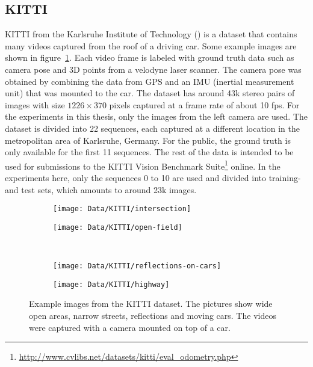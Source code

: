 		\subsection{KITTI}
			KITTI from the Karlsruhe Institute of Technology (\cite{geiger2013vision}) is a dataset that contains many videos captured from the roof of a driving car.
			Some example images are shown in figure~\ref{fig:example-images-from-KITTI}.
			Each video frame is labeled with ground truth data such as camera pose and 3D points from a velodyne laser scanner.
			The camera pose was obtained by combining the data from GPS and an IMU (inertial measurement unit) that was mounted to the car.
			The dataset has around 43k stereo pairs of images with size $1226 \times 370$ pixels captured at a frame rate of about 10 fps.
			For the experiments in this thesis, only the images from the left camera are used.
			The dataset is divided into 22 sequences, each captured at a different location in the metropolitan area of Karlsruhe, Germany.
			For the public, the ground truth is only available for the first 11 sequences.
			The rest of the data is intended to be used for submissions to the KITTI Vision Benchmark Suite\footnote{\url{http://www.cvlibs.net/datasets/kitti/eval_odometry.php}} 
			online.
			In the experiments here, only the sequences 0 to 10 are used and divided into training- and test sets, which amounts to around 23k images.
			\begin{figure}
				\def\imwidth{5.9cm}
				\centering
				\begin{subfigure}[b]{0.5\linewidth}
					\centering
					\texttt{[image: Data/KITTI/intersection]}
				\end{subfigure}\hfill%
				\begin{subfigure}[b]{0.5\linewidth}
					\centering
					\texttt{[image: Data/KITTI/open-field]}
				\end{subfigure}\hfill%
				\\
				\vspace{0.1cm}
				\begin{subfigure}[b]{0.5\linewidth}
					\centering
					\texttt{[image: Data/KITTI/reflections-on-cars]}
				\end{subfigure}\hfill%
				\begin{subfigure}[b]{0.5\linewidth}
					\centering
					\texttt{[image: Data/KITTI/highway]}
				\end{subfigure}\hfill%
				\caption[Example images from the KITTI dataset]
						{Example images from the KITTI dataset.
						 The pictures show wide open areas, narrow streets, reflections and moving cars.
						 The videos were captured with a camera mounted on top of a car.
						 \label{fig:example-images-from-KITTI}}
			\end{figure}
		
